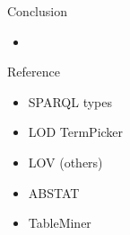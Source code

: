 \documentclass{beamer}
\begin{document}





\begin{frame}{Conclusion}
	\begin{itemize}
		\item
	\end{itemize}
\end{frame}

\begin{frame}{Reference}
	\begin{itemize}
		\item SPARQL types
		\item LOD TermPicker
		\item LOV (others)
		\item ABSTAT
		\item TableMiner
	\end{itemize}
\end{frame}
\end{document}
